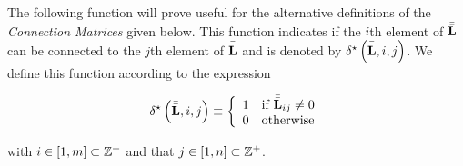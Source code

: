 \documentclass[../../ClusteringConnectionsMAIN.tex]{subfiles}
\begin{document}
\begin{flushleft}
\begin{large}


The following function will prove useful for the alternative definitions of the \emph{Connection Matrices} given below.  This function indicates if the $i$th element of $\bar{\bar{\mathbf{L}}}$ can be connected to the $j$th element of $\bar{\bar{\mathbf{L}}}$ and is denoted by $\delta^\star \left( \bar{\bar{\mathbf{L}}}, i, j \right)$.  We define this function according to the expression

\begin{align}
\delta^\star \left( \bar{\bar{\mathbf{L}}}, i, j \right) \equiv \left\{
\begin{array}{l l}
1 & \text{if } \bar{\bar{\mathbf{L}}}_{ij} \neq 0 \\
0 & \text{otherwise}
\end{array}
\right.
\end{align}

with $i \in \left[ 1, m \right] \subset \mathbb{Z}^+$ and that $j \in \left[ 1, n \right] \subset \mathbb{Z}^+$.


\end{large}
\end{flushleft}
\end{document}
